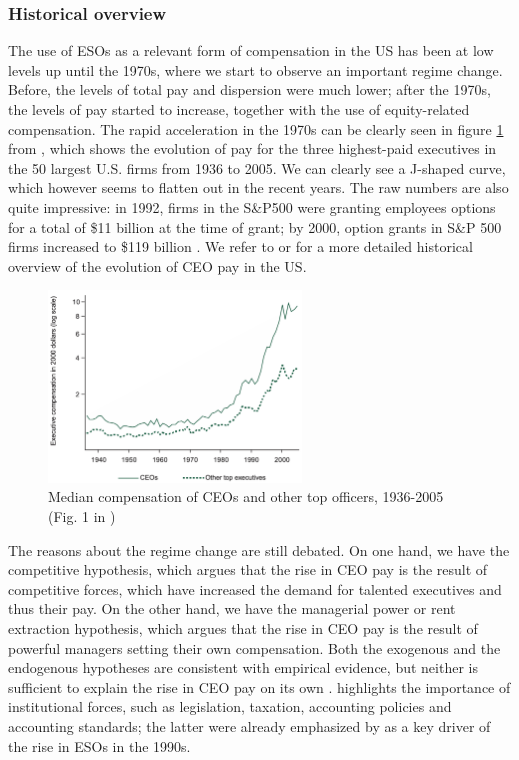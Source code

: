 \subsubsection{Historical overview}
The use of ESOs as a relevant form of compensation in the US has been at low levels up until the 1970s, where we start to observe an important regime change. Before, the levels of total pay and dispersion were much lower; after the 1970s, the levels of pay started to increase, together with the use of equity-related compensation.
The rapid acceleration in the 1970s can be clearly seen in figure \ref*{fig:frydman_fig1} from \cite{frydman2010ceo}, which shows the evolution of pay for the three highest-paid executives in the 50 largest U.S. firms from 1936 to 2005. We can clearly see a J-shaped curve, which however seems to flatten out in the recent years. The raw numbers are also quite impressive: in 1992, firms in the S\&P500 were granting employees options for a total of \$11 billion at the time of grant; by 2000, option grants in S\&P 500 firms increased to \$119 billion \cite{hall2003trouble}. We refer to \cite{frydman2010ceo} or \cite{edmans2017executive} for a more detailed historical overview of the evolution of CEO pay in the US. 

\vspace*{15pt}
\begin{figure}[H]
    \centering
    \includegraphics[width=0.6\textwidth]{fig/2/Frydman_fig1.png}
    \caption{Median compensation of CEOs and other top officers, 1936-2005 (Fig. 1 in \cite{frydman2010ceo})}
    \label{fig:frydman_fig1}
\end{figure}
\vspace*{15pt}


The reasons about the regime change are still debated. On one hand, we have the competitive hypothesis, which argues that the rise in CEO pay is the result of competitive forces, which have increased the demand for talented executives and thus their pay. On the other hand, we have the managerial power or rent extraction hypothesis, which argues that the rise in CEO pay is the result of powerful managers setting their own compensation. Both the exogenous and the endogenous hypotheses are consistent with empirical evidence, but neither is sufficient to explain the rise in CEO pay on its own \cite{frydman2010ceo}. \cite{edmans2017executive} highlights the importance of institutional forces, such as legislation, taxation, accounting policies and accounting standards; the latter were already emphasized by \cite{hall2003trouble} as a key driver of the rise in ESOs in the 1990s. 


